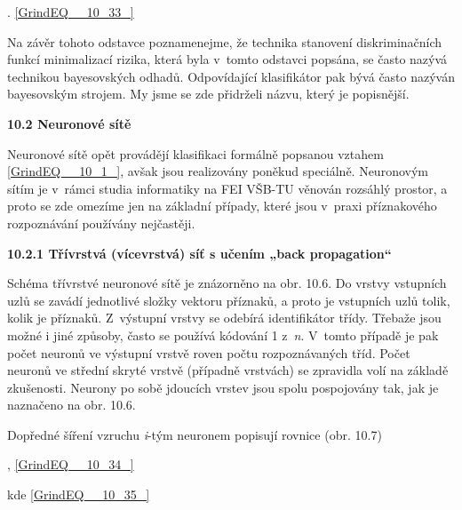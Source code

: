  . \eqref{GrindEQ__10_33_}

\noindent Na závěr tohoto odstavce poznamenejme, že technika stanovení diskriminačních funkcí minimalizací rizika, která byla v~tomto odstavci popsána, se často nazývá technikou bayesovských odhadů. Odpovídající klasifikátor pak bývá často nazýván bayesovským strojem. My jsme se zde přidrželi názvu, který je popisnější.

\noindent \textbf{10.2  Neuronové sítě}

\noindent Neuronové sítě opět provádějí klasifikaci formálně popsanou vztahem \eqref{GrindEQ__10_1_}, avšak jsou realizovány poněkud speciálně. Neuronovým sítím je v~rámci studia informatiky na FEI VŠB-TU věnován rozsáhlý prostor, a proto se zde omezíme jen na základní případy, které jsou v~praxi příznakového rozpoznávání používány nejčastěji.

\noindent 

\noindent \textbf{10.2.1 Třívrstvá (vícevrstvá) síť s učením „back propagation``}

\noindent 

\noindent 

\noindent Schéma třívrstvé neuronové sítě je znázorněno na obr. 10.6. Do vrstvy vstupních uzlů se zavádí jednotlivé složky vektoru příznaků, a proto je vstupních uzlů tolik, kolik je příznaků. Z~výstupní vrstvy se odebírá identifikátor třídy. Třebaže jsou možné i jiné způsoby, často se používá kódování 1 z~\textit{n}. V~tomto případě je pak počet neuronů ve výstupní vrstvě roven počtu rozpoznávaných tříd. Počet neuronů ve střední skryté vrstvě (případně vrstvách) se zpravidla volí na základě zkušenosti. Neurony po sobě jdoucích vrstev jsou spolu pospojovány tak, jak je naznačeno na obr. 10.6.

\noindent Dopředné šíření vzruchu \textit{i}-tým neuronem popisují rovnice (obr. 10.7)

 , \eqref{GrindEQ__10_34_}

 kde    \eqref{GrindEQ__10_35_}

\noindent 

